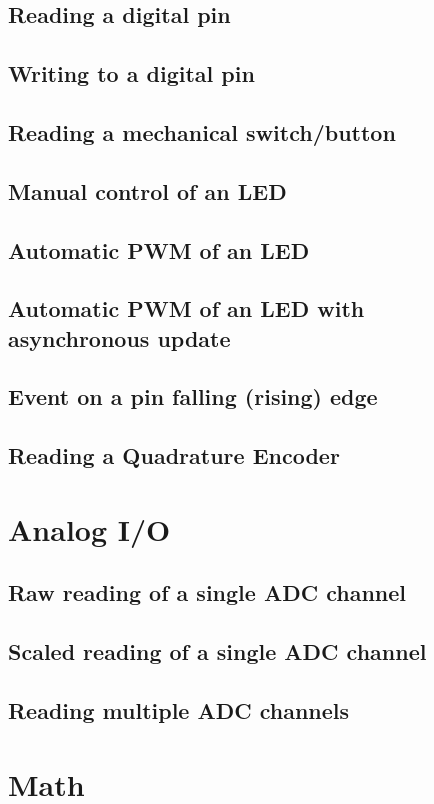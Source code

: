 \documentclass[10pt,letterpaper]{memoir} %
\begin{document}
\section{Reading a digital pin}
\section{Writing to a digital pin}
\section{Reading a mechanical switch/button}
\section{Manual control of an LED}
\section{Automatic PWM of an LED}
\section{Automatic PWM of an LED with asynchronous update}
\section{Event on a pin falling (rising) edge}
\section{Reading a Quadrature Encoder}

\chapter{Analog I/O}
\section{Raw reading of a single ADC channel}
\section{Scaled reading of a single ADC channel}
\section{Reading multiple ADC channels}

\chapter{Math}
\end{document}
